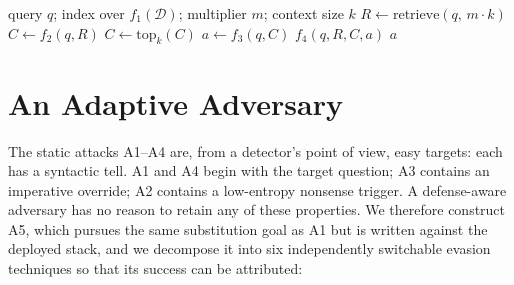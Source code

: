 \begin{algorithm}[H]
\caption{Defended query path}
\label{alg:pipeline}
\begin{algorithmic}[1]
\Require query $q$; index over $f_1(\mathcal{D})$; multiplier $m$; context size $k$
\State $R \gets \mathrm{retrieve}(q,\, m\cdot k)$ 
\State $C \gets f_2(q, R)$ 
\State $C \gets \mathrm{top}_k(C)$
\State $a \gets f_3(q, C)$ 
\State $f_4(q, R, C, a)$ 
\State \Return $a$
\end{algorithmic}
\end{algorithm}

\section{An Adaptive Adversary}
\label{sec:adaptive}

The static attacks A1--A4 are, from a detector's point of view, easy targets: each has a
syntactic tell. A1 and A4 begin with the target question; A3 contains an imperative override;
A2 contains a low-entropy nonsense trigger. A defense-aware adversary has no reason to retain
any of these properties. We therefore construct A5, which pursues the same substitution goal as
A1 but is written against the deployed stack, and we decompose it into six independently
switchable evasion techniques so that its success can be attributed:

